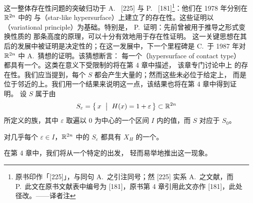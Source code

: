 这一整体存在性问题的突破归功于 A.~\trWeinstein{} [225] 与%
P.~\trRabinowitz{} [181]\footnote{原书印作「[225]」，与同句 A.~\trWeinstein{}之引注同号；然 [225] 实系 A.~\trWeinstein{}之文献，而 P.~\trRabinowitz{}此文在原书文献表中编号为 [181]，原书第 4 章引用此文亦作 [181]，此处径改。——译者注}：他们在 1978 年分别在 $\mathbb{R}^{2n}$ 中的%
\trConvex\trHypersurface{}与\textbf{\trStarShaped\trHypersurface}（star-like
hypersurface）上建立了\trClosedCharacteristic{}的存在性。这些证明以%
\textbf{\trVariationalPrinciple}（variational principle）为基础。特别是，%
P.~\trRabinowitz{}证明：先前曾被用于推导\trHamiltonianVectorField{}之形式变换性质的%
那条高度\trDegenerate{}的\trAction{}原理，可以十分有效地用于存在性证明。%
这一关键思想在其后的发展中被证明是决定性的；在这一发展中，下一个里程碑是%
C.~\trViterbo{}于 1987 年对 $\mathbb{R}^{2n}$ 中 A.~\trWeinstein{}猜想的证明。该猜想断言：%
每一个\textbf{\trContactType\trHypersurface}（hypersurface of contact type）%
都具有一个\trClosedCharacteristic。这类在\trSymplectic{}意义下受限制的\trHypersurface{}将在第 4 章中描述，%
该章专门讨论\trSymplecticManifold{}中\trHypersurface{}上%
\trClosedCharacteristic{}的存在性。我们应当提到，每个\trCompact\trHypersurface{} $S$%
都会产生大量的\trPeriodicOrbit；然而这些\trOrbit{}未必位于给定\trSurface{}上，%
而是位于邻近的\trSurface{}上。我们用一个结果来说明这一点，该结果也将在第 4 章中得到证明。%
设\trHypersurface{} $S$ 属于由
\[
S_{\varepsilon}=\bigl\{\,x\ \bigm|\ H(x)=1+\varepsilon\,\bigr\}\subset\R^{2n}
\]
所定义的族，其中 $\varepsilon$ 取遍以 $0$ 为中心的一个区间 $I$ 内的值，而 $S$ 对应于 $S_{0}$。

\begin{theorem}\label{thm:almost-every-epsilon}
对几乎每个 $\varepsilon\in I$，$\mathbb{R}^{2n}$ 中的\trHypersurface{} $S_{\varepsilon}$%
都具有\trHamiltonianVectorField{} $X_{H}$ 的一个\trPeriodicSolution。
\end{theorem}

在第 4 章中，我们将从一个特定的\trSymplecticInvariant{}出发，%
轻而易举地推出这一现象。
